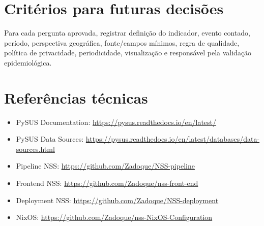 \documentclass[12pt,a4paper]{article}
\begin{document}
\section{Critérios para futuras decisões}
Para cada pergunta aprovada, registrar definição do indicador, evento contado, período, perspectiva geográfica, fonte/campos mínimos, regra de qualidade, política de privacidade, periodicidade, visualização e responsável pela validação epidemiológica.
\section{Referências técnicas}
\begin{itemize}[leftmargin=*]\item PySUS Documentation: \url{https://pysus.readthedocs.io/en/latest/}\item PySUS Data Sources: \url{https://pysus.readthedocs.io/en/latest/databases/data-sources.html}\item Pipeline NSS: \url{https://github.com/Zadoque/NSS-pipeline}\item Frontend NSS: \url{https://github.com/Zadoque/nss-front-end}\item Deployment NSS: \url{https://github.com/Zadoque/NSS-deployment}\item NixOS: \url{https://github.com/Zadoque/nss-NixOS-Configuration}\end{itemize}
\end{document}
